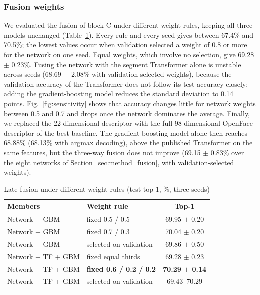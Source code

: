 \documentclass[pdflatex,iicol,sn-basic]{sn-jnl}
\begin{document}
\subsubsection{Fusion weights}\label{sec:abl_fusion}

We evaluated the fusion of block C under different weight rules, keeping all three models unchanged (Table~\ref{tab:fusion}). Every rule and every seed gives between 67.4\% and 70.5\%; the lowest values occur when validation selected a weight of 0.8 or more for the network on one seed. Equal weights, which involve no selection, give 69.28 $\pm$ 0.23\%. Fusing the network with the segment Transformer alone is unstable across seeds (68.69 $\pm$ 2.08\% with validation-selected weights), because the validation accuracy of the Transformer does not follow its test accuracy closely; adding the gradient-boosting model reduces the standard deviation to 0.14 points. Fig.~\ref{fig:sensitivity} shows that accuracy changes little for network weights between 0.5 and 0.7 and drops once the network dominates the average. Finally, we replaced the 22-dimensional descriptor with the full 98-dimensional OpenFace descriptor of the best baseline. The gradient-boosting model alone then reaches 68.88\% (68.13\% with argmax decoding), above the published Transformer on the same features, but the three-way fusion does not improve (69.15 $\pm$ 0.83\% over the eight networks of Section~\ref{sec:method_fusion}, with validation-selected weights).

\begin{table}[t]
\caption{Late fusion under different weight rules (test top-1, \%, three seeds)}\label{tab:fusion}
\begin{tabular*}{\textwidth}{@{\extracolsep\fill}llc}
\toprule
Members & Weight rule & Top-1\\
\midrule
Network + GBM & fixed 0.5 / 0.5 & 69.95 $\pm$ 0.20\\
Network + GBM & fixed 0.7 / 0.3 & 70.04 $\pm$ 0.20\\
Network + GBM & selected on validation & 69.86 $\pm$ 0.50\\
Network + TF + GBM & fixed equal thirds & 69.28 $\pm$ 0.23\\
Network + TF + GBM & \textbf{fixed 0.6 / 0.2 / 0.2} & \textbf{70.29 $\pm$ 0.14}\\
Network + TF + GBM & selected on validation & 69.43--70.29\\
\botrule
\end{tabular*}
\end{table}
\end{document}
